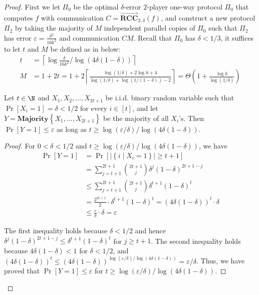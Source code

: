 \documentclass{toc}
\newcommand{\set}[1]{{\left \{{#1} \right \}}}
\newcommand{\st}{\;|\;}
\newcommand{\ceil}[1]{ {\left\lceil{#1} \right\rceil}}
\newcommand{\error}{\ensuremath{\delta}}
\newcommand{\gap}{\ensuremath{\varepsilon}}
\newcommand{\bigtheta}[1]{\ensuremath{{\Theta\left({#1} \right)}}}
\newcommand{\rccone}{\ensuremath{\overrightarrow{\mathbf{RCC}}}}
\begin{document}
\begin{proof}


First we let $\Pi_0$ be the optimal $\error$-error $2$-player one-way protocol $\Pi_0$ that computes $f$ with communication $C=\rccone_{2,\error}(f)$,
and construct a new protocol $\Pi_2$ by taking 
the majority of $M$ independent parallel copies of $\Pi_0$ such that $\Pi_2$ has error $\varepsilon = \frac{\error^2}{16k^2}$ and communication ${C M}$.
Recall that $\Pi_0$ has $\error<1/3$,  it suffices to let $t$ and $M$ be defined as in  below:
\begin{align}\label{equ:M}
t &= \ceil{\log\frac{\error}{16k^2}/\log\left(4\error(1-\error) \right)}\\
M &=1+2t=1+2\ceil{\frac{\log(1/\error)+2\log k+4}{\log(1/\error)+\log(1/(1-\error))-2}}=\bigtheta{1+\frac{\log k}{\log(1/\error)}}	
\end{align}


\begin{lemma}\label{lemma:amp}
Let $t\in \N$ and $X_1,X_2,\dots, X_{2t+1}$ be i.i.d. binary random variable such that $\Pr[X_i=1]=\error<1/2$ for every $i\in[t]$,
and let $Y=\mathbf{Majority}\set{X_1,\dots, X_{2t+1}}$ be the majority of all $X_i$'s.
Then $\Pr[Y=1]\le \gap$ as long as $t\ge \log(\gap/\error)/\log(4\error(1-\error))$.	
\end{lemma}

\begin{proof}
For $0<\error<1/2$ and $t\ge \log(\gap/\error)/\log(4\error(1-\error))$,
we have 
\begin{align*}
	\Pr\left[ Y=1 \right] &= \Pr\left[ |\set{i\st X_i=1}|\ge t+1 \right]
	\\
	&= \sum_{j=t+1}^{2t+1} \binom{2t+1}{j} \error^j(1-\error)^{2t+1-j}\\
	&\le \sum_{j=t+1}^{2t+1} \binom{2t+1}{j} \error^{t+1}(1-\error)^{t}\\
	&=\frac{2^{2t+1}}{2} \cdot \error^{t+1}(1-\error)^{t}
	=\left( 4\error(1-\error) \right)^t \cdot\error\\
	&\le \frac{\gap}{\error} \cdot\error =\gap
\end{align*}


The first inequality holds because $\error<1/2$ and hence $\error^j(1-\error)^{2t+1-j}\le \error^{t+1}(1-\error)^{t}$ for $j\ge t+1$.	
The second inequality holds because $4\error(1-\error)<1$ for $\error<1/2$, and $\left( 4\error(1-\error) \right)^t\le \left( 4\error(1-\error) \right)^{\log(\gap/\error)/\log(4\error(1-\error))} = \gap/\error$. 
Thus, we have proved that $\Pr[Y=1]\le \gap$ for $t \ge {\log(\gap/\error)/\log(4\error(1-\error))}$.
\end{proof}



\end{proof}
\end{document}
